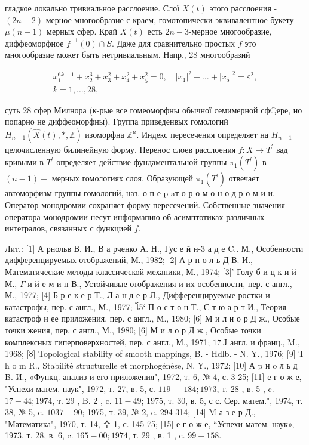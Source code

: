 \documentclass[10pt]{article}
\begin{document}
гладкое локально тривиальное расслоение. Слої $X(t)$ этого расслоения - $(2 n-2)$-мерное многообразие с краем, гомотопически эквивалентное букету $\mu(n-1)$ мерных сфер. Край $X(t)$ есть $2 n-3$-мерное многообразие, диффеоморфное $f^{-1}(0) \cap S$. Даже для сравнительно простых $f$ это многообразие может быть нетривиальным. Напр., 28 многообразий

\[
\begin{gathered}
x_{1}^{6 k-1}+x_{2}^{3}+x_{3}^{2}+x_{4}^{2}+x_{5}^{2}=0, \quad\left|x_{1}\right|^{2}+\ldots+\left|x_{5}\right|^{2}=\varepsilon^{2}, \\
k=1, \ldots, 28,
\end{gathered}
\]

суть 28 сфер Милнора (к-рые все гомеоморфны обычної семимерной сф্ере, но попарно не диффеоморфны). Группа приведенвых гомологий $H_{n-1}(\hat{X}(t), *, \mathbb{Z})$ изоморфна $\mathbb{Z}^{\mu}$. Индекс пересечения определяет на $H_{n-1}$ целочисленную билинейную форму. Перенос слоев расслоения $f: X \rightarrow T^{\prime}$ вад кривыми в $T^{\prime}$ определяет действие фундаментальной группы $\pi_{1}\left(T^{\prime}\right)$ в $(n-1)-$ мерных гомологиях слоя. Образующей $\pi_{1}\left(T^{\prime}\right)$ отвечает автоморфизм группы гомологий, наз. о п е p aт о р о м о н о д р о м и и. Оператор монодромии сохраняет форму пересечений. Собственные значения оператора монодромии несут информапию об асимптотиках различных интегралов, связанных с функцией $f$.

Лит.: [1] А рнольв В. И., В а рченко А. Н., Гус е й н-3 а д е C.. М., Особенности дифференцируемых отображений, М., 1982; [2] А р н о л ь Д В. И., Математические методы классической механики, М., 1974; [3]' Голу б и ц к и й М., $\Gamma$ и й е м и н В., Устойчивые отображения и их особенности, пер. с англ., М., 1977; [4] Б р е к е р Т., Л а н д е р Л., Дифференцируемые ростки и катастрофы, пер. с англ., М., 1977; โ5` П о с т о н Т., С т ю а р т И., Теория катастроф и ее приложения, пер. с англ., М., 1980; [6] М и л н о р Д ж., Особые точки жения, пер. с англ., М., 1980; [6] М и л о р Д ж., Особые точки комплексных гиперповерхностей, пер. с англ., М., 1971; $17 \mathrm{~J}$ англ. и франц., M., 1968; [8] Topological stability of smooth mappings, B. - Hdlb. - N. Y., 1976; [9] T h o m R., Stabilité structurelle et morphogénèse, N. Y., 1972; [10] А p н o л ь д B. И., «Функц. анализ и его приложения", 1972, т. 6, № 4, с. 3-25; [11] е г о ж е, "Успехи матем. наук", 1972, т. 27, в. 5, с. $119-$ $184 ; 1973$, т. 28 , в. 5 , c. $17-44 ; 1974$, т. 29 , B. 2 , c. $11-49$; 1975, т. 30, в. 5, с с. Сер. матем.", 1974, т. 38, № 5, c. $1037-90$; 1975, т. 39, № 2, c. 294-314; [14] M а з е р Д., "Математика", 1970, т. 14, 수 1, с. 145-75; [15] е г о ж е, “Успехи матем. наук», 1973, т. 28, в. 6, c. $165-00 ; 1974$, т. 29 , в. 1 , c. $99-158$.
\end{document}

